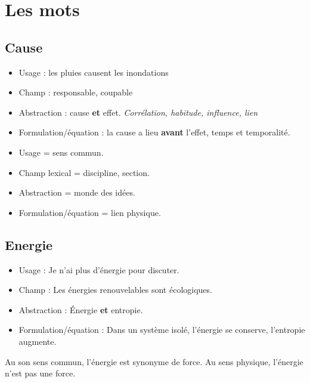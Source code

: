 \section{Les mots}
\subsection{Cause}

\begin{itemize}[leftmargin=2cm, label=, itemsep=20pt]
\item Usage : les pluies causent les inondations
\item Champ : responsable, coupable
\item Abstraction : cause {\bf et} effet. {\it Corrélation, habitude, influence, lien}
\item Formulation/équation : la cause a lieu {\bf avant} l'effet, temps et temporalité.
\end{itemize}

\begin{itemize}[leftmargin=2cm, label=, itemsep=10pt]
\item Usage = sens commun.
\item Champ lexical = discipline, section.
\item Abstraction = monde des idées.
\item Formulation/équation = lien physique.
\end{itemize}

\subsection{Energie}

\begin{itemize}[leftmargin=2cm, label=, itemsep=20pt]%
\item Usage : Je n'ai plus d'énergie pour discuter.
\item Champ : Les énergies renouvelables sont écologiques.
\item Abstraction : Énergie {\bf et} entropie.
\item Formulation/équation : Dans un système isolé, l'énergie se conserve, l'entropie augmente.
\end{itemize}

Au son sens commun, l'énergie est synonyme de force. Au sens physique, l'énergie n'est pas une force.
